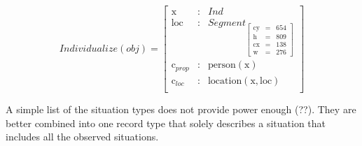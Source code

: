 \documentclass[11pt, a4paper]{article}
\begin{document}
\begin{equation}\label{eq:ind1}
Individualize(obj) = 
\left[\begin{array}{rcl}
\text{x} &:& Ind\\
\text{loc} &:& Segment_{\left[\begin{array}{rcl}
	\text{cy} &=& 654\\
	\text{h} &=& 809\\
	\text{cx} &=& 138\\
	\text{w} &=& 276
	\end{array}\right]}\\
\text{c}_{prop} &:& \text{person}(\text{x})\\
\text{c}_{loc} &:& \text{location}(\text{x}, \text{loc})\\
\end{array}\right]
\end{equation}

A simple list of the situation types does not provide power enough (??).
They are better combined into one record type that solely describes a situation that includes all the observed situations.
\end{document}

